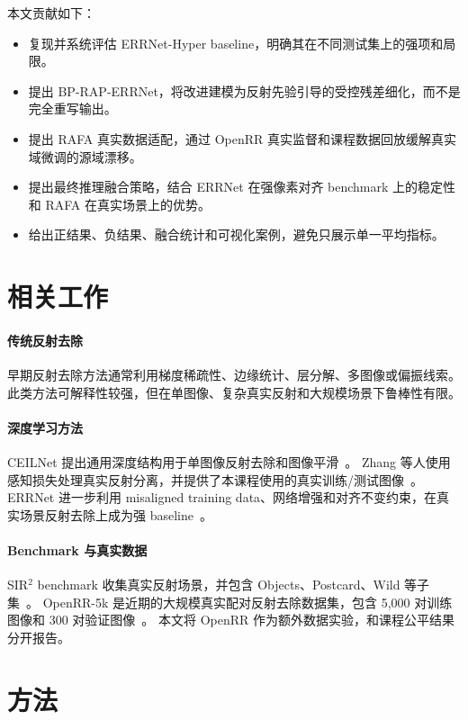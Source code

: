 \documentclass{article}
\begin{document}
本文贡献如下：
\begin{itemize}
  \item 复现并系统评估 ERRNet-Hyper baseline，明确其在不同测试集上的强项和局限。
  \item 提出 BP-RAP-ERRNet，将改进建模为反射先验引导的受控残差细化，而不是完全重写输出。
  \item 提出 RAFA 真实数据适配，通过 OpenRR 真实监督和课程数据回放缓解真实域微调的源域漂移。
  \item 提出最终推理融合策略，结合 ERRNet 在强像素对齐 benchmark 上的稳定性和 RAFA 在真实场景上的优势。
  \item 给出正结果、负结果、融合统计和可视化案例，避免只展示单一平均指标。
\end{itemize}

\section{相关工作}

\paragraph{传统反射去除}
早期反射去除方法通常利用梯度稀疏性、边缘统计、层分解、多图像或偏振线索。此类方法可解释性较强，但在单图像、复杂真实反射和大规模场景下鲁棒性有限。

\paragraph{深度学习方法}
CEILNet 提出通用深度结构用于单图像反射去除和图像平滑~\cite{fan2017ceilnet}。
Zhang 等人使用感知损失处理真实反射分离，并提供了本课程使用的真实训练/测试图像~\cite{zhang2018perceptual}。
ERRNet 进一步利用 misaligned training data、网络增强和对齐不变约束，在真实场景反射去除上成为强 baseline~\cite{wei2019errnet}。

\paragraph{Benchmark 与真实数据}
SIR$^2$ benchmark 收集真实反射场景，并包含 Objects、Postcard、Wild 等子集~\cite{wan2017sir2}。
OpenRR-5k 是近期的大规模真实配对反射去除数据集，包含 5,000 对训练图像和 300 对验证图像~\cite{cai2025openrr}。
本文将 OpenRR 作为额外数据实验，和课程公平结果分开报告。

\section{方法}
\end{document}
